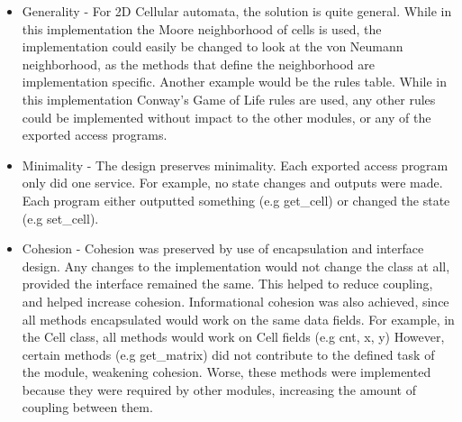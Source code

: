 \documentclass[]{article}
\begin{document}
\begin{itemize}
\item Generality - For 2D Cellular automata, the solution is quite general. While in this implementation the Moore neighborhood of cells is used, the implementation could easily be changed to look at the von Neumann neighborhood, as the methods that define the neighborhood are implementation specific. Another example would be the rules table. While in this implementation Conway's Game of Life rules are used, any other rules could be implemented without impact to the other modules, or any of the exported access programs.

\item Minimality - The design preserves minimality. Each exported access program only did one service. For example, no state changes and outputs were made. Each program either outputted something (e.g get\_cell) or changed the state (e.g set\_cell). 

\item Cohesion - Cohesion was preserved by use of encapsulation and interface design. Any changes to the implementation would not change the class at all, provided the interface remained the same. This helped to reduce coupling, and helped increase cohesion. Informational cohesion was also achieved, since all methods encapsulated would work on the same data fields. For example, in the Cell class, all methods would work on Cell fields (e.g cnt, x, y) However, certain methods (e.g get\_matrix) did not contribute to the defined task of the module, weakening cohesion. Worse, these methods were implemented because they were required by other modules, increasing the amount of coupling between them. 
\end{itemize}
\end{document}
